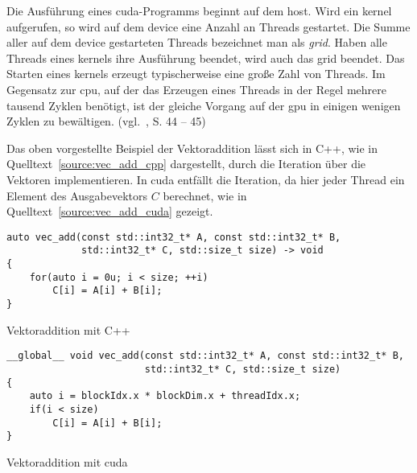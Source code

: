 Die Ausführung eines \gls{cuda}-Programms beginnt auf dem \gls{host}. Wird ein \gls{kernel} aufgerufen, so wird auf dem
\gls{device} eine Anzahl an Threads gestartet. Die Summe aller auf dem \gls{device} gestarteten Threads bezeichnet
man als \textit{\gls{grid}}. Haben alle Threads eines \gls{kernel}s ihre Ausführung beendet, wird auch das \gls{grid}
beendet. Das Starten eines \gls{kernel}s erzeugt typischerweise eine große Zahl von Threads. Im Gegensatz zur \gls{cpu},
auf der das Erzeugen eines Threads in der Regel mehrere tausend Zyklen benötigt, ist der gleiche Vorgang auf der
\gls{gpu} in einigen wenigen Zyklen zu bewältigen. (vgl.~\cite{kirkhwu}, S. 44 -- 45)

Das oben vorgestellte Beispiel der Vektoraddition lässt sich in C++, wie in Quelltext~\ref{source:vec_add_cpp}
dargestellt, durch die Iteration über die Vektoren implementieren.  In \gls{cuda} entfällt die Iteration, da hier 
jeder Thread ein Element des Ausgabevektors $C$ berechnet, wie in Quelltext~\ref{source:vec_add_cuda} gezeigt.

\begin{listing}
\begin{verbatim}
auto vec_add(const std::int32_t* A, const std::int32_t* B,
             std::int32_t* C, std::size_t size) -> void
{
    for(auto i = 0u; i < size; ++i)
        C[i] = A[i] + B[i];
}
\end{verbatim}
\caption{Vektoraddition mit C++}
\label{source:vec_add_cpp}
\end{listing}

\begin{listing}
\begin{verbatim}
__global__ void vec_add(const std::int32_t* A, const std::int32_t* B,
                        std::int32_t* C, std::size_t size)
{
    auto i = blockIdx.x * blockDim.x + threadIdx.x;
    if(i < size)
        C[i] = A[i] + B[i];
}
\end{verbatim}
\caption{Vektoraddition mit \gls{cuda}}
\label{source:vec_add_cuda}
\end{listing}

